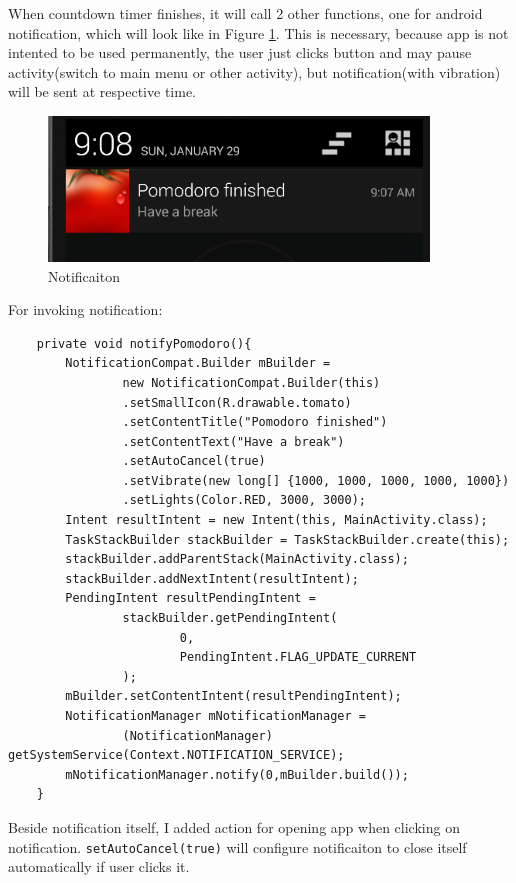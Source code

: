When countdown timer finishes, it will call 2 other functions, one for android notification, 
which will look like in Figure \ref{fig:notify}. This is necessary, because app is not intented
to be used permanently, the user just clicks button and may pause activity(switch to main menu or other
activity), but notification(with vibration) will be sent at respective time.
\begin{figure}[H]
    \centering
    \includegraphics[width=0.9\textwidth]{screen2.png}
    \caption{Notificaiton}
    \label{fig:notify}
\end{figure}

For invoking notification:
\begin{verbatim}
    private void notifyPomodoro(){
        NotificationCompat.Builder mBuilder =
                new NotificationCompat.Builder(this)
                .setSmallIcon(R.drawable.tomato)
                .setContentTitle("Pomodoro finished")
                .setContentText("Have a break")
                .setAutoCancel(true)
                .setVibrate(new long[] {1000, 1000, 1000, 1000, 1000})
                .setLights(Color.RED, 3000, 3000);
        Intent resultIntent = new Intent(this, MainActivity.class);
        TaskStackBuilder stackBuilder = TaskStackBuilder.create(this);
        stackBuilder.addParentStack(MainActivity.class);
        stackBuilder.addNextIntent(resultIntent);
        PendingIntent resultPendingIntent =
                stackBuilder.getPendingIntent(
                        0,
                        PendingIntent.FLAG_UPDATE_CURRENT
                );
        mBuilder.setContentIntent(resultPendingIntent);
        NotificationManager mNotificationManager =
                (NotificationManager) getSystemService(Context.NOTIFICATION_SERVICE);
        mNotificationManager.notify(0,mBuilder.build());
    }
\end{verbatim}
Beside notification itself, I added action for opening app when clicking on notification. 
\texttt{setAutoCancel(true)} will configure notificaiton to close itself automatically if user
clicks it.


